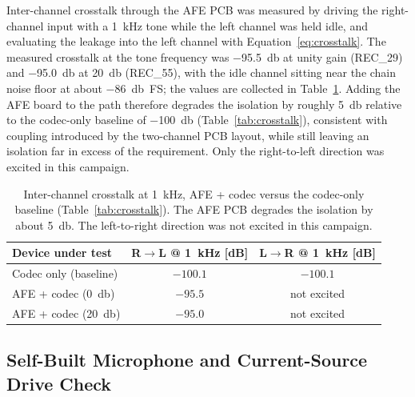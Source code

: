 Inter-channel crosstalk through the AFE PCB was measured by driving the right-channel input with a \SI{1}{\kilo\hertz} tone while the left channel was held idle, and evaluating the leakage into the left channel with Equation~\eqref{eq:crosstalk}. The measured crosstalk at the tone frequency was \SI{-95.5}{\decibel} at unity gain (REC\_29) and \SI{-95.0}{\decibel} at \SI{20}{\decibel} (REC\_55), with the idle channel sitting near the chain noise floor at about \SI{-86}{\decibel FS}; the values are collected in Table~\ref{tab:res_int_crosstalk}. Adding the AFE board to the path therefore degrades the isolation by roughly \SI{5}{\decibel} relative to the codec-only baseline of \SI{-100}{\decibel} (Table~\ref{tab:crosstalk}), consistent with coupling introduced by the two-channel PCB layout, while still leaving an isolation far in excess of the requirement. Only the right-to-left direction was excited in this campaign.
\begin{table}[h!]
\centering
\begin{tabular}{lcc}
\hline
\textbf{Device under test} & \textbf{R$\to$L @ \SI{1}{\kilo\hertz} [dB]} & \textbf{L$\to$R @ \SI{1}{\kilo\hertz} [dB]} \\
\hline
Codec only (baseline)      & $-100.1$ & $-100.1$ \\
AFE + codec (\SI{0}{\decibel})  & $-95.5$  & not excited \\
AFE + codec (\SI{20}{\decibel}) & $-95.0$  & not excited \\
\hline
\end{tabular}
\caption{Inter-channel crosstalk at \SI{1}{\kilo\hertz}, AFE + codec versus the codec-only baseline (Table~\ref{tab:crosstalk}). The AFE PCB degrades the isolation by about \SI{5}{\decibel}. The left-to-right direction was not excited in this campaign.}
\label{tab:res_int_crosstalk}
\end{table}

\subsection{Self-Built Microphone and Current-Source Drive Check}
\label{sec:res_s3_dummy}

